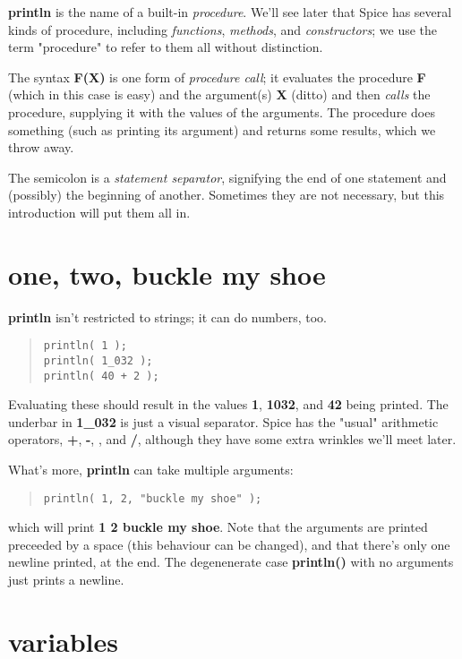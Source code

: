 \documentclass{report}
\begin{document}
{\bf println} is the name of a built-in {\em procedure}. We'll see later that Spice
has several kinds of procedure, including {\em functions}, {\em methods}, and
{\em constructors}; we use the term "procedure" to refer to them all without
distinction.

The syntax {\bf F(X)} is one form of {\em procedure call}; it evaluates the procedure
{\bf F} (which in this case is easy) and the argument(s) {\bf X} (ditto) and then
{\em calls} the procedure, supplying it with the values of the arguments. The
procedure does something (such as printing its argument) and returns some
results, which we throw away.

The semicolon is a {\em statement separator}, signifying the end of one statement
and (possibly) the beginning of another. Sometimes they are not necessary, but
this introduction will put them all in.\section{one, two, buckle my shoe}


{\bf println} isn't restricted to strings; it can do numbers, too.

\begin{quote}
\begin{verbatim}
println( 1 );
println( 1_032 );
println( 40 + 2 );
\end{verbatim}
\end{quote}
Evaluating these should result in the values {\bf 1}, {\bf 1032}, and {\bf 42} being
printed. The underbar in {\bf 1\_032} is just a visual separator. Spice has the
"usual" arithmetic operators, {\bf +}, {\bf -}, {\bf *}, and {\bf /}, although they have some
extra wrinkles we'll meet later.

What's more, {\bf println} can take multiple arguments:

\begin{quote}
\begin{verbatim}
println( 1, 2, "buckle my shoe" );
\end{verbatim}
\end{quote}
which will print {\bf 1 2 buckle my shoe}. Note that the arguments are printed
preceeded by a space (this behaviour can be changed), and that there's
only one newline printed, at the end. The degenenerate case {\bf println()} with
no arguments just prints a newline.\section{variables}
\end{document}
